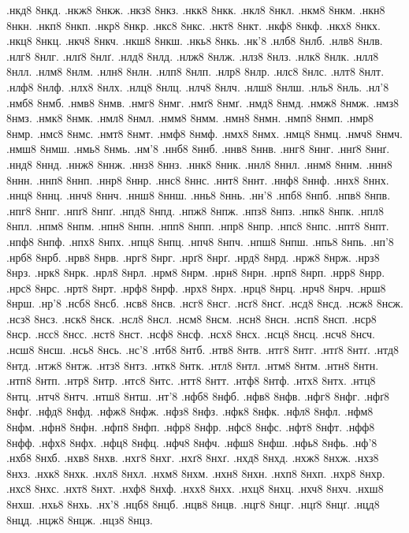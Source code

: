 {.нкд8 8нкд.
.нкж8 8нкж.
.нкз8 8нкз.
.нкк8 8нкк.
.нкл8 8нкл.
.нкм8 8нкм.
.нкн8 8нкн.
.нкп8 8нкп.
.нкр8 8нкр.
.нкс8 8нкс.
.нкт8 8нкт.
.нкф8 8нкф.
.нкх8 8нкх.
.нкц8 8нкц.
.нкч8 8нкч.
.нкш8 8нкш.
.нкь8 8нкь.
.нк'8
.нлб8 8нлб.
.нлв8 8нлв.
.нлг8 8нлг.
.нлґ8 8нлґ.
.нлд8 8нлд.
.нлж8 8нлж.
.нлз8 8нлз.
.нлк8 8нлк.
.нлл8 8нлл.
.нлм8 8нлм.
.нлн8 8нлн.
.нлп8 8нлп.
.нлр8 8нлр.
.нлс8 8нлс.
.нлт8 8нлт.
.нлф8 8нлф.
.нлх8 8нлх.
.нлц8 8нлц.
.нлч8 8нлч.
.нлш8 8нлш.
.нль8 8нль.
.нл'8
.нмб8 8нмб.
.нмв8 8нмв.
.нмг8 8нмг.
.нмґ8 8нмґ.
.нмд8 8нмд.
.нмж8 8нмж.
.нмз8 8нмз.
.нмк8 8нмк.
.нмл8 8нмл.
.нмм8 8нмм.
.нмн8 8нмн.
.нмп8 8нмп.
.нмр8 8нмр.
.нмс8 8нмс.
.нмт8 8нмт.
.нмф8 8нмф.
.нмх8 8нмх.
.нмц8 8нмц.
.нмч8 8нмч.
.нмш8 8нмш.
.нмь8 8нмь.
.нм'8
.ннб8 8ннб.
.ннв8 8ннв.
.ннг8 8ннг.
.ннґ8 8ннґ.
.ннд8 8ннд.
.ннж8 8ннж.
.ннз8 8ннз.
.ннк8 8ннк.
.ннл8 8ннл.
.ннм8 8ннм.
.ннн8 8ннн.
.ннп8 8ннп.
.ннр8 8ннр.
.ннс8 8ннс.
.ннт8 8ннт.
.ннф8 8ннф.
.ннх8 8ннх.
.ннц8 8ннц.
.ннч8 8ннч.
.ннш8 8ннш.
.ннь8 8ннь.
.нн'8
.нпб8 8нпб.
.нпв8 8нпв.
.нпг8 8нпг.
.нпґ8 8нпґ.
.нпд8 8нпд.
.нпж8 8нпж.
.нпз8 8нпз.
.нпк8 8нпк.
.нпл8 8нпл.
.нпм8 8нпм.
.нпн8 8нпн.
.нпп8 8нпп.
.нпр8 8нпр.
.нпс8 8нпс.
.нпт8 8нпт.
.нпф8 8нпф.
.нпх8 8нпх.
.нпц8 8нпц.
.нпч8 8нпч.
.нпш8 8нпш.
.нпь8 8нпь.
.нп'8
.нрб8 8нрб.
.нрв8 8нрв.
.нрг8 8нрг.
.нрґ8 8нрґ.
.нрд8 8нрд.
.нрж8 8нрж.
.нрз8 8нрз.
.нрк8 8нрк.
.нрл8 8нрл.
.нрм8 8нрм.
.нрн8 8нрн.
.нрп8 8нрп.
.нрр8 8нрр.
.нрс8 8нрс.
.нрт8 8нрт.
.нрф8 8нрф.
.нрх8 8нрх.
.нрц8 8нрц.
.нрч8 8нрч.
.нрш8 8нрш.
.нр'8
.нсб8 8нсб.
.нсв8 8нсв.
.нсг8 8нсг.
.нсґ8 8нсґ.
.нсд8 8нсд.
.нсж8 8нсж.
.нсз8 8нсз.
.нск8 8нск.
.нсл8 8нсл.
.нсм8 8нсм.
.нсн8 8нсн.
.нсп8 8нсп.
.нср8 8нср.
.нсс8 8нсс.
.нст8 8нст.
.нсф8 8нсф.
.нсх8 8нсх.
.нсц8 8нсц.
.нсч8 8нсч.
.нсш8 8нсш.
.нсь8 8нсь.
.нс'8
.нтб8 8нтб.
.нтв8 8нтв.
.нтг8 8нтг.
.нтґ8 8нтґ.
.нтд8 8нтд.
.нтж8 8нтж.
.нтз8 8нтз.
.нтк8 8нтк.
.нтл8 8нтл.
.нтм8 8нтм.
.нтн8 8нтн.
.нтп8 8нтп.
.нтр8 8нтр.
.нтс8 8нтс.
.нтт8 8нтт.
.нтф8 8нтф.
.нтх8 8нтх.
.нтц8 8нтц.
.нтч8 8нтч.
.нтш8 8нтш.
.нт'8
.нфб8 8нфб.
.нфв8 8нфв.
.нфг8 8нфг.
.нфґ8 8нфґ.
.нфд8 8нфд.
.нфж8 8нфж.
.нфз8 8нфз.
.нфк8 8нфк.
.нфл8 8нфл.
.нфм8 8нфм.
.нфн8 8нфн.
.нфп8 8нфп.
.нфр8 8нфр.
.нфс8 8нфс.
.нфт8 8нфт.
.нфф8 8нфф.
.нфх8 8нфх.
.нфц8 8нфц.
.нфч8 8нфч.
.нфш8 8нфш.
.нфь8 8нфь.
.нф'8
.нхб8 8нхб.
.нхв8 8нхв.
.нхг8 8нхг.
.нхґ8 8нхґ.
.нхд8 8нхд.
.нхж8 8нхж.
.нхз8 8нхз.
.нхк8 8нхк.
.нхл8 8нхл.
.нхм8 8нхм.
.нхн8 8нхн.
.нхп8 8нхп.
.нхр8 8нхр.
.нхс8 8нхс.
.нхт8 8нхт.
.нхф8 8нхф.
.нхх8 8нхх.
.нхц8 8нхц.
.нхч8 8нхч.
.нхш8 8нхш.
.нхь8 8нхь.
.нх'8
.нцб8 8нцб.
.нцв8 8нцв.
.нцг8 8нцг.
.нцґ8 8нцґ.
.нцд8 8нцд.
.нцж8 8нцж.
.нцз8 8нцз.
}
